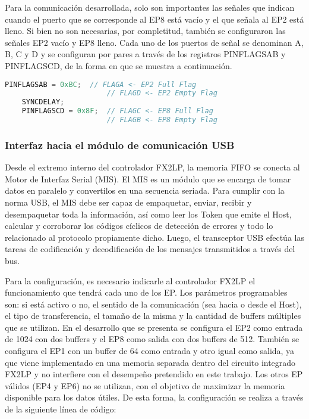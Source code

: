 	Para la comunicación desarrollada, solo son importantes las señales que indican cuando el puerto que se corresponde al EP8 está vacío y el que señala al EP2 está lleno. Si bien no son necesarias, por completitud, también se configuraron las señales EP2 vacío y EP8 lleno. Cada uno de los puertos de señal se denominan A, B, C y D y se configuran por pares a través de los registros PINFLAGSAB y PINFLAGSCD, de la forma en que se muestra a continuación.
	
	\begin{lstlisting}[language=C,backgroundcolor=\color{gray!30}]
	PINFLAGSAB = 0xBC;	// FLAGA <- EP2 Full Flag
						// FLAGD <- EP2 Empty Flag
	SYNCDELAY;
	PINFLAGSCD = 0x8F;	// FLAGC <- EP8 Full Flag
						// FLAGB <- EP8 Empty Flag
	\end{lstlisting}
	
	
\subsubsection{Interfaz hacia el módulo de comunicación USB}
	Desde el extremo interno del controlador FX2LP, la memoria FIFO se conecta al Motor de Interfaz Serial (MIS). El MIS es un módulo que se encarga de tomar datos en paralelo y convertilos en una secuencia seriada. Para cumplir con la norma USB, el MIS debe ser capaz de empaquetar, enviar, recibir y desempaquetar toda la información, así como leer los Token que emite el Host, calcular y corroborar los códigos cíclicos de detección de errores y todo lo relacionado al protocolo propiamente dicho. Luego, el transceptor USB efectúa las tareas de codificación y decodificación de los mensajes transmitidos a través del bus.
	
	Para la configuración, es necesario indicarle al controlador FX2LP el funcionamiento que tendrá cada uno de los EP. Los parámetros programables son: si está activo o no, el sentido de la comunicación (sea hacia o desde el Host), el tipo de transferencia, el tamaño de la misma y la cantidad de buffers múltiples que se utilizan. En el desarrollo que se presenta se configura el EP2 como entrada de \SI{1024}{\byte} con dos buffers y el EP8 como salida con dos buffers de \SI{512}{\byte}. También se configura el EP1 con un buffer de \SI{64}{\byte} como entrada y otro igual como salida, ya que viene implementado en una memoria separada dentro del circuito integrado FX2LP y no interfiere con el desempeño pretendido en este trabajo. Los otros EP válidos (EP4 y EP6) no se utilizan, con el objetivo de maximizar la memoria disponible para los datos útiles. De esta forma, la configuración se realiza a través de la siguiente línea de código:
	
